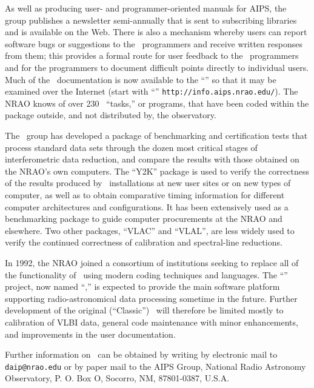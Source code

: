 As well as producing user- and programmer-oriented manuals for AIPS,
the group publishes a newsletter semi-annually that is sent to
subscribing libraries and is available on the Web.  There is also a
mechanism whereby users can report software bugs or suggestions to the
\AIPS\ programmers and receive written responses from them; this
provides a formal route for user feedback to the \AIPS\ programmers
and for the programmers to document difficult points directly to
individual users.  Much of the \AIPS\ documentation is now available
to the ``'' so that it may be examined over the
Internet (start with ``'' {\tt http://info.aips.nrao.edu/}).
The NRAO knows of over 230 \AIPS\ ``tasks,'' or programs, that have
been coded within the package outside, and not distributed by, the
observatory.

    The \AIPS\ group has developed a package of
benchmarking and certification tests that process standard data sets
through the dozen most critical stages of interferometric data
reduction, and compare the results with those obtained on the NRAO's
own computers. The ``Y2K'' package is used to verify the correctness
of the results produced by \AIPS\ installations at new user sites or
on new types of computer, as well as to obtain comparative timing
information for different computer architectures and configurations.
It has been extensively used as a benchmarking package to guide
computer procurements at the NRAO and elsewhere.  Two other packages,
``VLAC'' and ``VLAL'', are less widely used to verify the continued
correctness of calibration and spectral-line reductions.

     In 1992, the NRAO joined a consortium of institutions seeking to
replace all of the functionality of \AIPS\ using modern coding
techniques and languages.  The ``{\tt {}}'' project, now
named ``{\tt {}},'' is expected to provide the main software
platform supporting radio-astronomical data processing sometime in the
future.  Further development of the original (``Classic'') \AIPS\ will
therefore be limited mostly to calibration of VLBI data, general code
maintenance with minor enhancements, and improvements in the user
documentation.

    Further information on \AIPS\ can be obtained by writing by
electronic mail to {\tt daip@nrao.edu} or by paper mail to the AIPS
Group, National Radio Astronomy Observatory, P. O. Box O, Socorro, NM,
87801-0387, U.S.A.


